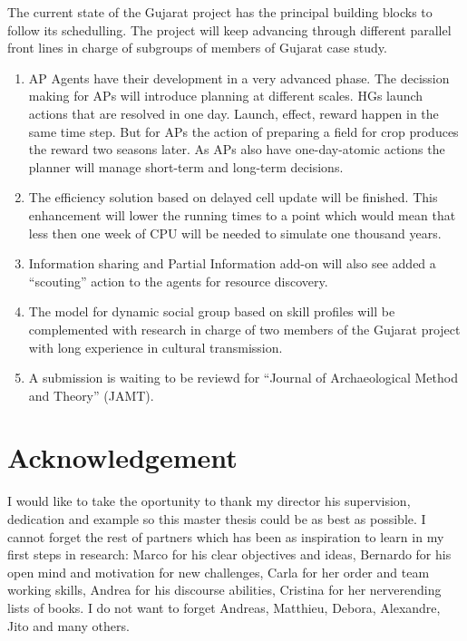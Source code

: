 \documentclass[11pt,oneside,a4paper,openright]{report}
\begin{document}
The current state of the Gujarat project has the principal building blocks to follow its schedulling. 
The project will keep advancing through different parallel front lines in charge of subgroups of members of Gujarat case study. 
\begin{enumerate}

\item AP Agents have their development in a very advanced phase. The decission making for APs will introduce
planning at different scales. HGs launch actions that are resolved in one day. Launch, effect, reward
happen in the same time step. But for APs the action of preparing a field for crop produces the reward
two seasons later. As APs also have one-day-atomic actions the planner will manage short-term and long-term 
decisions.

\item The efficiency solution based on delayed cell update will be finished. This enhancement will lower the
running times to a point which would mean that less then one week of CPU will be needed to simulate one
thousand years.

\item Information sharing and Partial Information add-on will also see added a ``scouting'' action to the 
agents for resource discovery.

\item The model for dynamic social group based on skill profiles will be complemented with research in
charge of two members of the Gujarat project with long experience in cultural transmission.

\item A submission is waiting to be reviewd for ``Journal of Archaeological Method and Theory'' (JAMT).

\end{enumerate}


\chapter{Acknowledgement}

I would like to take the oportunity to thank my director his supervision, dedication and example
so this master thesis could be as best as possible. I cannot forget the rest of partners
which has been as inspiration to learn in my first steps in research: Marco for his clear
objectives and ideas, Bernardo for his open mind and motivation for new challenges, Carla
for her order and team working skills, Andrea for his discourse abilities, Cristina for her 
nerverending lists of books. I do not want to forget Andreas, Matthieu, Debora, Alexandre,
Jito and many others.
\end{document}
